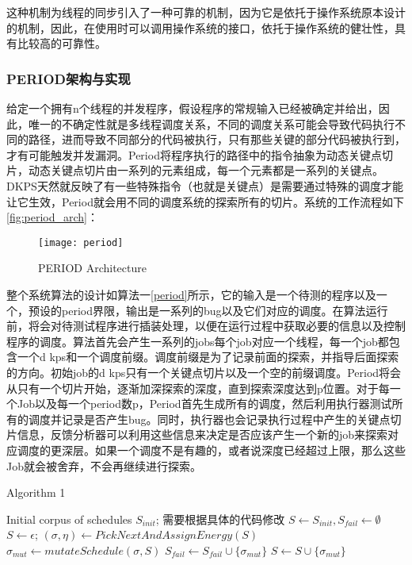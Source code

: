 这种机制为线程的同步引入了一种可靠的机制，因为它是依托于操作系统原本设计的机制，因此，在使用时可以调用操作系统的接口，依托于操作系统的健壮性，具有比较高的可靠性。

\subsubsection{PERIOD架构与实现}

给定一个拥有n个线程的并发程序，假设程序的常规输入已经被确定并给出，因此，唯一的不确定性就是多线程调度关系，不同的调度关系可能会导致代码执行不同的路径，进而导致不同部分的代码被执行，只有那些关键的部分代码被执行到，才有可能触发并发漏洞。Period将程序执行的路径中的指令抽象为动态关键点切片，动态关键点切片由一系列的元素组成，每一个元素都是一系列的关键点。DKPS天然就反映了有一些特殊指令（也就是关键点）是需要通过特殊的调度才能让它生效，Period就会用不同的调度系统的探索所有的切片。系统的工作流程如下\autoref{fig:period_arch}：

\begin{figure}[ht]
    \centering
    \texttt{[image: period]}
    \caption{\label{fig:period_arch}PERIOD Architecture}
\end{figure}

整个系统算法的设计如算法一\autoref{period}所示，它的输入是一个待测的程序以及一个，预设的period界限，输出是一系列的bug以及它们对应的调度。在算法运行前，将会对待测试程序进行插装处理，以便在运行过程中获取必要的信息以及控制程序的调度。算法首先会产生一系列的jobs每个job对应一个线程，每一个job都包含一个d kps和一个调度前缀。调度前缀是为了记录前面的探索，并指导后面探索的方向。初始job的d kps只有一个关键点切片以及一个空的前缀调度。Period将会从只有一个切片开始，逐渐加深探索的深度，直到探索深度达到p位置。对于每一个Job以及每一个period数p，Period首先生成所有的调度，然后利用执行器测试所有的调度并记录是否产生bug。同时，执行器也会记录执行过程中产生的关键点切片信息，反馈分析器可以利用这些信息来决定是否应该产生一个新的job来探索对应调度的更深层。如果一个调度不是有趣的，或者说深度已经超过上限，那么这些Job就会被舍弃，不会再继续进行探索。

\begin{algorithm}[!ht]
\caption{Algorithm 1}
\label{period}
\begin{algorithmic}[1]
    \REQUIRE  Initial corpus of schedules $S_{init}$; %
    需要根据具体的代码修改
    \STATE $S \leftarrow S_{init}, S_{fail} \leftarrow \emptyset$
     \STATE $S \leftarrow {\epsilon}$;
    \ENDIF
    \REPEAT
        \STATE $(\sigma, \eta) \leftarrow PickNextAndAssignEnergy(S)$
            \STATE $\sigma_{mut} \leftarrow mutateSchedule(\sigma, S)$
             \STATE $S_{fail} \leftarrow S_{fail} \cup \{\sigma_{mut}\}$
            \ENDIF
             \STATE $S \leftarrow S \cup \{\sigma_{mut}\}$
            \ENDIF
        \ENDFOR
\end{algorithmic}  
\end{algorithm}

